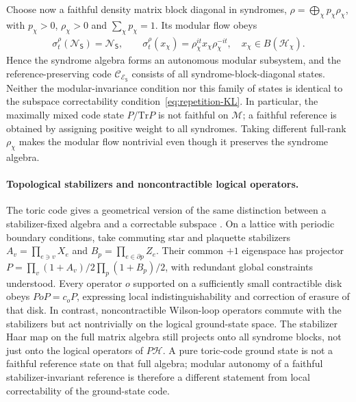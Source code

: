 \documentclass[a4paper,11pt]{article}
\theoremstyle{definition}
\newcommand{\cH}{\mathcal{H}}
\newcommand{\Tr}{\text{Tr}}
\newcommand{\mN}{\mathcal{N}}
\newcommand{\mM}{\mathcal{M}}
\newcommand{\mE}{\mathcal{E}}
\begin{document}
Choose now a faithful density matrix block diagonal in syndromes,
$\rho=\bigoplus_\chi p_\chi\rho_\chi$, with
$p_\chi>0$, $\rho_\chi>0$ and $\sum_\chi p_\chi=1$. Its modular
flow obeys
\begin{align}
 \sigma_t^\rho(\mN_{\mathsf S})=\mN_{\mathsf S},
 \qquad
 \sigma_t^\rho(x_\chi)=\rho_\chi^{it}x_\chi\rho_\chi^{-it},
 \quad x_\chi\in B(\cH_\chi).
 \label{eq:stabilizer-modular-flow}
\end{align}
Hence the syndrome algebra forms an autonomous modular subsystem, and
the reference-preserving code $\mathcal C_{\mE_{\mathsf S}}$ consists of
all syndrome-block-diagonal states. Neither the modular-invariance
condition nor this family of states is identical to the subspace
correctability condition~\eqref{eq:repetition-KL}. In particular, the
maximally mixed code state $P/\Tr P$ is not faithful on $\mM$; a
faithful reference is obtained by assigning positive weight to all
syndromes. Taking different full-rank $\rho_\chi$ makes the modular
flow nontrivial even though it preserves the syndrome algebra.

\paragraph{Topological stabilizers and noncontractible logical operators.}
The toric code gives a geometrical version of the same distinction
between a stabilizer-fixed algebra and a correctable subspace
\cite{Kitaev2003}. On a lattice with periodic boundary conditions,
take commuting star and plaquette stabilizers
$A_v=\prod_{e\ni v}X_e$ and $B_p=\prod_{e\in\partial p}Z_e$.
Their common $+1$ eigenspace has projector
$P=\prod_v(1+A_v)/2\prod_p(1+B_p)/2$, with redundant global
constraints understood. Every operator $o$ supported on a sufficiently
small contractible disk obeys $PoP=c_oP$, expressing local
indistinguishability and correction of erasure of that disk. In contrast,
noncontractible Wilson-loop operators commute with the stabilizers but
act nontrivially on the logical ground-state space. The stabilizer Haar
map on the full matrix algebra still projects onto all syndrome blocks,
not just onto the logical operators of $P\cH$. A pure toric-code ground
state is not a faithful reference state on that full algebra; modular
autonomy of a faithful stabilizer-invariant reference is therefore a
different statement from local correctability of the ground-state code.
\end{document}
